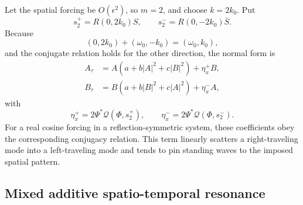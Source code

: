 \documentclass[11pt]{article}
\newcommand{\cQ}{\mathcal{Q}}
\begin{document}
Let the spatial forcing be $O(\epsilon^2)$, so $m=2$, and choose
$k=2k_0$.  Put
\begin{equation}
  s_2^+=R(0,2k_0)S,
  \qquad
  s_2^-=R(0,-2k_0)\overline S.
\end{equation}
Because
\begin{equation}
  (0,2k_0)+(\omega_0,-k_0)=(\omega_0,k_0),
\end{equation}
and the conjugate relation holds for the other direction, the normal form is
\begin{subequations}
\begin{align}
  A_\tau&=A(a+b|A|^2+c|B|^2)+\eta_x^+B,\\
  B_\tau&=B(a+b|B|^2+c|A|^2)+\eta_x^-A,
\end{align}
\end{subequations}
with
\begin{equation}
  \eta_x^+=2\Psi^*\cQ(\Phi,s_2^+),
  \qquad
  \eta_x^-=2\Psi^*\cQ(\Phi,s_2^-).
  \label{eq:eta-space}
\end{equation}
For a real cosine forcing in a reflection-symmetric system, these coefficients
obey the corresponding conjugacy relation.  This term linearly scatters a
right-traveling mode into a left-traveling mode and tends to pin standing
waves to the imposed spatial pattern.

\subsection{Mixed additive spatio-temporal resonance}
\end{document}
